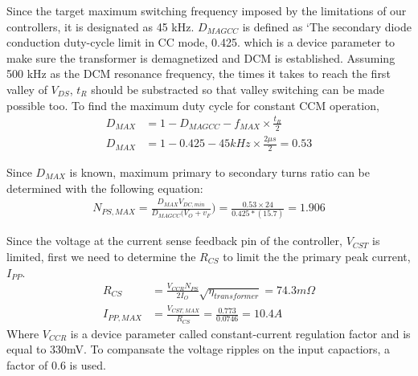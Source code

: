 Since the target maximum switching frequency imposed by the limitations of our controllers, it is designated as 45 kHz. $D_{MAGCC}$ is defined as `The secondary diode conduction duty-cycle limit in CC mode, 0.425. which is a device parameter to make sure the transformer is demagnetized and DCM is established. Assuming 500 kHz as the DCM resonance frequency, the times it takes to reach the first valley of $V_{DS}$, $t_R$ should be substracted so that valley switching can be made possible too. To find the maximum duty cycle for constant CCM operation,
\begin{align*}
D_{MAX}&=1-D_{MAGCC}-f_{MAX}\times\frac{t_R}{2}\\
D_{MAX}&=1-0.425-45kHz\times \frac{2 \mu s}{2}=0.53
\end{align*}
\par Since $D_{MAX}$ is known, maximum primary to secondary turns ratio can be determined with the following equation:
\begin{align*}
    N_{PS,MAX}=\frac{D_{MAX} V_{DC,min}}{D_{MAGCC}(V_{O}+v_F})=\frac{0.53\times 24}{0.425*(15.7)}=1.906
\end{align*}

Since the voltage at the current sense feedback pin of the controller, $V_{CST}$ is limited, first we need to determine the $R_{CS}$ to limit the the primary peak current,$I_{PP}$.
\begin{align*}
    R_{CS}&=\frac{V_{CCR}N_{PS}}{2I_{O}}\sqrt{\eta_{transformer}}=74.3m\Omega\\
    I_{PP,MAX}&=\frac{V_{CST,MAX}}{R_{CS}}=\frac{0.773}{0.0746}=10.4A
\end{align*}
Where $V_{CCR}$ is a device parameter called constant-current regulation factor and is equal to 330mV.
To compansate the voltage ripples on the input capactiors, a factor of 0.6 is used. 



